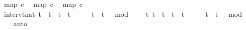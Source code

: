 \begin{isabellebody}
\isanewline
{}\isamarkupfalse%
\ {\isacartoucheopen}map\ c{}\ {\isacharbrackleft}{}{\isacharcomma}{}{\isacharcomma}{}{\isacharcomma}{}{\isacharcomma}{}{\isacharcomma}{}{\isacharcomma}{}{\isacharcomma}{}{\isacharcomma}{}{\isacharcomma}{}{\isacharcomma}{}{}{\isacharbrackright}{\isacartoucheclose}\isanewline
{}\isamarkupfalse%
\ {\isacartoucheopen}map\ c{}\ {\isacharbrackleft}{}{\isacharcomma}{}{\isacharcomma}{}{\isacharcomma}{}{\isacharcomma}{}{\isacharcomma}{}{\isacharcomma}{}{\isacharcomma}{}{\isacharcomma}{}{\isacharcomma}{}{\isacharcomma}{}{}{\isacharbrackright}{\isacartoucheclose}\isanewline
{}\isamarkupfalse%
\ {\isacartoucheopen}map\ c{}\ {\isacharbrackleft}{}{\isacharcomma}{}{\isacharcomma}{}{\isacharcomma}{}{\isacharcomma}{}{\isacharcomma}{}{\isacharcomma}{}{\isacharcomma}{}{\isacharcomma}{}{\isacharcomma}{}{\isacharcomma}{}{}{\isacharbrackright}{\isacartoucheclose}\isanewline
\isanewline
{}\isamarkupfalse%
\ interv{\isacharunderscore}{}{\isacharcolon}{\isacartoucheopen}{\isacharbraceleft}t{\isacharcolon}{\isacharcolon}nat{\isachardot}\ t\ {\isasymle}\ t\ {\isasymand}\ t\ {\isacharless}\ t\ {\isacharplus}\ {}\ {\isasymand}\ {}\ {\isasymle}\ t\ {\isasymand}\ {\isacharparenleft}t\ {\isacharminus}\ {}{\isacharparenright}\ mod\ {}\ {\isacharequal}\ {}{\isacharbraceright}\ {\isacharequal}\ {\isacharbraceleft}t{\isachardot}\ {\isacharparenleft}t\ {\isacharequal}\ t\ {\isasymor}\ t\ {\isacharequal}\ t\ {\isacharplus}\ {}{\isacharparenright}\ {\isasymand}\ {}\ {\isasymle}\ t\ {\isasymand}\ {\isacharparenleft}t\ {\isacharminus}\ {}{\isacharparenright}\ mod\ {}\ {\isacharequal}\ {}{\isacharbraceright}{\isacartoucheclose}\isanewline
%
\isadelimproof
\ \ %
\endisadelimproof
%
\isatagproof
{}\isamarkupfalse%
\ auto%
\endisatagproof
{\isafoldproof}%
%
\isadelimproof
\isanewline
%
\endisadelimproof

\end{isabellebody}
